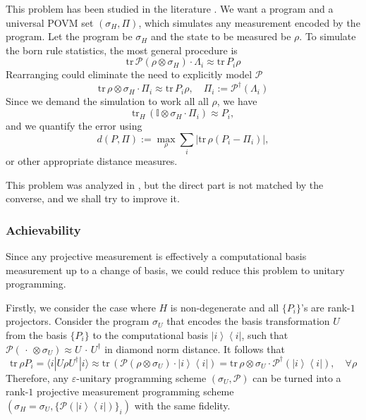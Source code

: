 \documentclass[11pt,letterpaper]{article}
\newcommand{\ket}[1]{| #1 \rangle}
\newcommand{\bra}[1]{\langle #1 |}
\newcommand{\ketbra}[2]{\left|#1\right\rangle\!\!\left\langle #2\right|}
\def\id{\mathbf{1}}
\def\eps{\varepsilon}
\def\id{\mathbb{I}}
\def\tr{\mathrm{tr}}
\begin{document}
This problem has been studied in the literature \cite{DAriano_2005,PrezGarca_2006}. We want a program and a universal POVM set $(\sigma_H,\Pi)$, which simulates any measurement encoded by the program. Let the program be $\sigma_H$ and the state to be measured be $\rho$. To simulate the born rule statistics, the most general procedure is
\begin{equation}
    \tr\, \mathcal{P}(\rho\otimes\sigma_H)\cdot\Lambda_i \approx \tr\,P_i\rho
\end{equation}
Rearranging could eliminate the need to explicitly model $\mathcal{P}$
\begin{equation}
    \tr\, \rho\otimes\sigma_H\cdot \Pi_i\approx \tr\,P_i\rho,\quad\Pi_i:=\mathcal{P}^\dagger(\Lambda_i)
\end{equation}
Since we demand the simulation to work all all $\rho$, we have
\begin{equation}
    \tr_H\, (\id\otimes\sigma_H\cdot \Pi_i)\approx  P_i,
\end{equation}
and we quantify the error using
\begin{equation}
    d(P,\Pi) := \max_\rho\sum_i|\tr\, \rho(P_i-\Pi_i)|,
\end{equation}
or other appropriate distance measures.

This problem was analyzed in \cite{DAriano_2005,PrezGarca_2006}, but the direct part is not matched by the converse, and we shall try to improve it. 

\subsubsection{Achievability}
Since any projective measurement is effectively a computational basis measurement up to a change of basis, we could reduce this problem to unitary programming. 

Firstly, we consider the case where $H$ is non-degenerate and all $\{P_i\}$'s are rank-$1$ projectors. Consider the program $\sigma_U$ that encodes the basis transformation $U$ from the basis $\{P_i\}$ to the computational basis $\ketbra{i}{i}$, such that 
$\mathcal{P}(\,\cdot\,\otimes\sigma_U)\approx U\,\cdot\,U^\dagger$ in diamond norm distance. It follows that
\begin{equation}
   \tr\,\rho P_i=\bra{i}U\rho U^\dagger\ket{i}\approx \tr\, (\mathcal{P}(\rho\otimes\sigma_U)\cdot\ketbra{i}{i})= \tr\,\rho\otimes\sigma_U\cdot\mathcal{P}^\dagger(\ketbra{i}{i}),\quad\forall\rho
\end{equation}
Therefore, any $\eps$-unitary programming scheme $(\sigma_U,\mathcal{P})$ can be turned into a rank-$1$ projective measurement programming scheme $(\sigma_H=\sigma_U,\{\mathcal{P}(\ketbra{i}{i})\}_i)$ with the same fidelity. 
\end{document}
